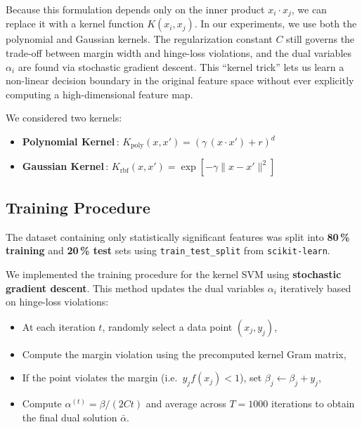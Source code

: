 \documentclass[12pt]{article}
\begin{document}
Because this formulation depends only on the inner product \(x_i\cdot x_j\), we can replace it with a kernel function \(K(x_i,x_j)\). In our experiments, we use both the polynomial and Gaussian kernels. The regularization constant \(C\) still governs the trade-off between margin width and hinge-loss violations, and the dual variables \(\alpha_i\) are found via stochastic gradient descent. This “kernel trick” lets us learn a non-linear decision boundary in the original feature space without ever explicitly computing a high-dimensional feature map.  

We considered two kernels:

\begin{itemize}
  \item \textbf{Polynomial Kernel}\,: $K_{\text{poly}}\!(x,x') = (\gamma\,(x{\cdot}x') + r)^{d}$
  \item \textbf{Gaussian Kernel}\,: $K_{\text{rbf}}\!(x,x') = \exp[-\gamma \lVert x - x'\rVert^{2}]$
\end{itemize}

\subsection{Training Procedure}
The dataset containing only statistically significant features was split into \textbf{80\,\% training} and \textbf{20\,\% test} sets using \texttt{train\_test\_split} from \texttt{scikit-learn}.

\vspace{0.5ex}
We implemented the training procedure for the kernel SVM using \textbf{stochastic gradient descent}. This method updates the dual variables $\alpha_i$ iteratively based on hinge-loss violations:

\begin{itemize}
  \item At each iteration $t$, randomly select a data point $(x_j, y_j)$,
  \item Compute the margin violation using the precomputed kernel Gram matrix,
  \item If the point violates the margin (i.e.\ $ y_j f(x_j) < 1 $), set $\beta_j \leftarrow \beta_j + y_j$,
  \item Compute $\alpha^{(t)} = \beta / (2 C t)$ and average across $T = 1000$ iterations to obtain the final dual solution $\bar{\alpha}$.
\end{itemize}
\end{document}

